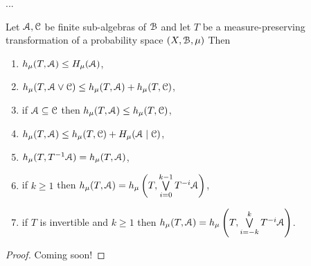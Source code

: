 ...

\begin{theorem}\label{thm:walters-4.12}
	Let $\mathcal{A}, \mathcal{C}$ be finite sub-algebras of $\mathcal{B}$ and let $T$ be a measure-preserving transformation of a probability space $(X, \mathcal{B}, \mu)$ Then
	\begin{enumerate}
		\item $h_\mu(T, \mathcal{A}) \leq H_\mu(\mathcal{A})$,
		\item $h_\mu(T, \mathcal{A} \vee \mathcal{C}) \leq h_\mu(T, \mathcal{A}) + h_\mu(T, \mathcal{C})$,
		\item if $\mathcal{A} \subseteq \mathcal{C}$ then $h_\mu(T, \mathcal{A}) \leq h_\mu(T, \mathcal{C})$,
		\item $h_\mu(T, \mathcal{A}) \leq h_\mu(T, \mathcal{C}) + H_\mu(\mathcal{A} \mid \mathcal{C})$,
		\item $h_\mu(T, T^{-1}{\mathcal{A}}) = h_\mu(T, \mathcal{A})$,
		\item if $k \geq 1$ then $h_\mu(T, \mathcal{A}) = h_\mu\left(T, \bigvee\limits_{i = 0}^{k - 1}{T^{-i}{\mathcal{A}}}\right)$,
		\item if $T$ is invertible and $k \geq 1$ then $h_\mu(T, \mathcal{A}) = h_\mu\left(T, \bigvee\limits_{i = -k}^k{T^{-i}{\mathcal{A}}}\right)$.
	\end{enumerate}
	\begin{proof}
		Coming soon!
	\end{proof}
\end{theorem}

